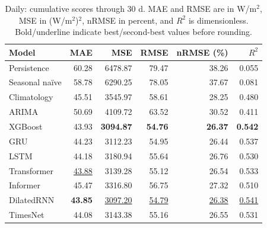 \begin{table}[!htbp]
\centering
\small
\setlength{\tabcolsep}{6pt}
\caption{Daily: cumulative scores through 30 d. MAE and RMSE are in W/m$^2$, MSE in (W/m$^2$)$^2$, nRMSE in percent, and $R^2$ is dimensionless. Bold/underline indicate best/second-best values before rounding.}
\label{tab:baseline_daily_30_30}
\begin{tabular}{@{}lrrrrr@{}}
\toprule
Model & MAE & MSE & RMSE & nRMSE (\%) & $R^2$ \\
\midrule
Persistence & 60.28 & 6478.87 & 79.47 & 38.26 & 0.055 \\
Seasonal na\"ive & 58.78 & 6290.25 & 78.05 & 37.67 & 0.081 \\
Climatology & 45.51 & 3545.97 & 58.61 & 28.25 & 0.480 \\
ARIMA & 50.69 & 4109.72 & 63.52 & 30.52 & 0.411 \\
XGBoost & 43.93 & \textbf{3094.87} & \textbf{54.76} & \textbf{26.37} & \textbf{0.542} \\
GRU & 44.23 & 3112.23 & 54.95 & 26.44 & 0.537 \\
LSTM & 44.18 & 3180.94 & 55.64 & 26.76 & 0.530 \\
Transformer & \underline{43.88} & 3139.28 & 55.12 & 26.54 & 0.533 \\
Informer & 45.47 & 3316.80 & 56.75 & 27.32 & 0.510 \\
DilatedRNN & \textbf{43.85} & \underline{3097.20} & \underline{54.79} & \underline{26.38} & \underline{0.541} \\
TimesNet & 44.08 & 3143.38 & 55.16 & 26.55 & 0.531 \\
\bottomrule
\end{tabular}
\end{table}

